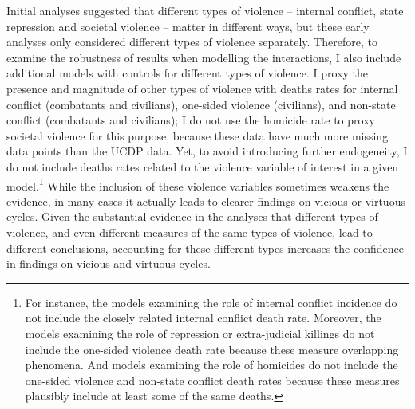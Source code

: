 \documentclass[12pt]{article}
\begin{document}
Initial analyses suggested that different types of violence -- internal conflict, state repression and societal violence -- matter in different ways, but these early analyses only considered different types of violence separately.
Therefore, to examine the robustness of results when modelling the interactions, I also include additional models with controls for different types of violence.
I proxy the presence and magnitude of other types of violence with deaths rates for internal conflict (combatants and civilians), one-sided violence (civilians), and non-state conflict (combatants and civilians); I do not use the homicide rate to proxy societal violence for this purpose, because these data have much more missing data points than the UCDP data.
Yet, to avoid introducing further endogeneity, I do not include deaths rates related to the violence variable of interest in a given model.\footnote{
For instance, the models examining the role of internal conflict incidence do not include the closely related internal conflict death rate. Moreover, the models examining the role of repression or extra-judicial killings do not include the one-sided violence death rate because these measure overlapping phenomena. And models examining the role of homicides do not include the one-sided violence and non-state conflict death rates because these measures plausibly include at least some of the same deaths.}
While the inclusion of these violence variables sometimes weakens the evidence, in many cases it actually leads to clearer findings on vicious or virtuous cycles. Given the substantial evidence in the analyses that different types of violence, and even different measures of the same types of violence, lead to different conclusions, accounting for these different types increases the confidence in findings on vicious and virtuous cycles.
\end{document}
